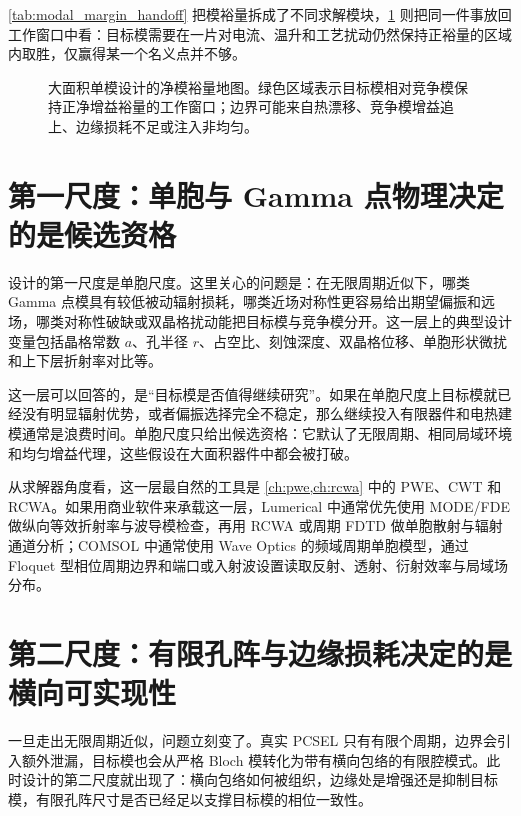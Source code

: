 \cref{tab:modal_margin_handoff} 把模裕量拆成了不同求解模块，\cref{fig:ch20_modal_margin_map} 则把同一件事放回工作窗口中看：目标模需要在一片对电流、温升和工艺扰动仍然保持正裕量的区域内取胜，仅赢得某一个名义点并不够。

\begin{figure}[htbp]
  \centering
  
  \caption{大面积单模设计的净模裕量地图。绿色区域表示目标模相对竞争模保持正净增益裕量的工作窗口；边界可能来自热漂移、竞争模增益追上、边缘损耗不足或注入非均匀。}
  \label{fig:ch20_modal_margin_map}
\end{figure}

\section{第一尺度：单胞与 Gamma 点物理决定的是候选资格}
设计的第一尺度是单胞尺度。这里关心的问题是：在无限周期近似下，哪类 Gamma 点模具有较低被动辐射损耗，哪类近场对称性更容易给出期望偏振和远场，哪类对称性破缺或双晶格扰动能把目标模与竞争模分开。这一层上的典型设计变量包括晶格常数 $a$、孔半径 $r$、占空比、刻蚀深度、双晶格位移、单胞形状微扰和上下层折射率对比等。

这一层可以回答的，是“目标模是否值得继续研究”。如果在单胞尺度上目标模就已经没有明显辐射优势，或者偏振选择完全不稳定，那么继续投入有限器件和电热建模通常是浪费时间。单胞尺度只给出候选资格：它默认了无限周期、相同局域环境和均匀增益代理，这些假设在大面积器件中都会被打破。

从求解器角度看，这一层最自然的工具是 \cref{ch:pwe,ch:rcwa} 中的 PWE、CWT 和 RCWA。如果用商业软件来承载这一层，Lumerical 中通常优先使用 MODE/FDE 做纵向等效折射率与波导模检查，再用 RCWA 或周期 FDTD 做单胞散射与辐射通道分析；COMSOL 中通常使用 Wave Optics 的频域周期单胞模型，通过 Floquet 型相位周期边界和端口或入射波设置读取反射、透射、衍射效率与局域场分布。

\section{第二尺度：有限孔阵与边缘损耗决定的是横向可实现性}
一旦走出无限周期近似，问题立刻变了。真实 PCSEL 只有有限个周期，边界会引入额外泄漏，目标模也会从严格 Bloch 模转化为带有横向包络的有限腔模式。此时设计的第二尺度就出现了：横向包络如何被组织，边缘处是增强还是抑制目标模，有限孔阵尺寸是否已经足以支撑目标模的相位一致性。

